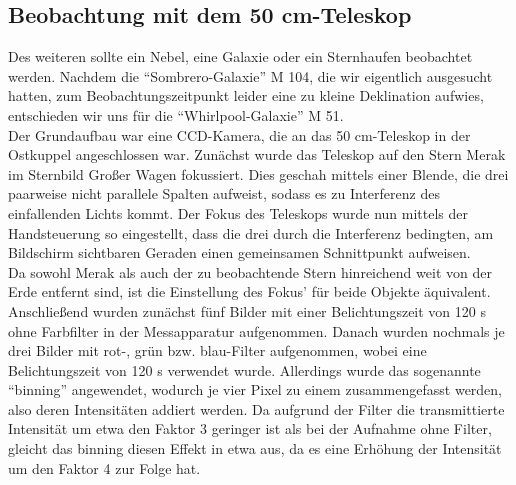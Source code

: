 \subsection{Beobachtung mit dem 50 cm-Teleskop}
Des weiteren sollte ein Nebel, eine Galaxie oder ein Sternhaufen beobachtet werden. Nachdem die \enquote{Sombrero-Galaxie} M 104, die wir eigentlich ausgesucht hatten, zum Beobachtungszeitpunkt leider eine zu kleine Deklination aufwies, entschieden wir uns für die \enquote{Whirlpool-Galaxie} M 51. \\
Der Grundaufbau war eine CCD-Kamera, die an das 50 cm-Teleskop in der Ostkuppel angeschlossen war. 
Zunächst wurde das Teleskop auf den Stern Merak im Sternbild Großer Wagen fokussiert. Dies geschah mittels einer Blende, die drei paarweise nicht parallele Spalten aufweist, sodass es zu Interferenz des einfallenden Lichts kommt. Der Fokus des Teleskops wurde nun mittels der Handsteuerung so eingestellt, dass die drei durch die Interferenz bedingten, am Bildschirm sichtbaren Geraden einen gemeinsamen Schnittpunkt aufweisen. \\
Da sowohl Merak als auch der zu beobachtende Stern hinreichend weit von der Erde entfernt sind, ist die Einstellung des Fokus' für beide Objekte äquivalent. \\
Anschließend wurden zunächst fünf Bilder mit einer Belichtungszeit von 120 s ohne Farbfilter in der Messapparatur aufgenommen. Danach wurden nochmals je drei Bilder mit rot-, grün bzw. blau-Filter aufgenommen, wobei eine Belichtungszeit von 120 s verwendet wurde. Allerdings wurde das sogenannte \enquote{binning} angewendet, wodurch je vier Pixel zu einem zusammengefasst werden, also deren Intensitäten addiert werden. Da aufgrund der Filter die transmittierte Intensität um etwa den Faktor 3 geringer ist als bei der Aufnahme ohne Filter, gleicht das binning diesen Effekt in etwa aus, da es eine Erhöhung der Intensität um den Faktor 4 zur Folge hat. 

